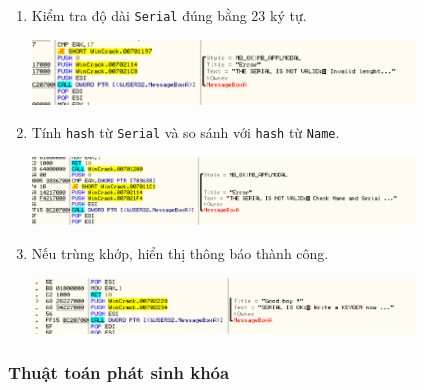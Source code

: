 \begin{enumerate}[label=\textbf{Bước \arabic*:}]
    \item Kiểm tra độ dài \texttt{Serial} đúng bằng 23 ký tự.
    \begin{center}
        \includegraphics[width=0.8\textwidth]{img/file-2/asm7.PNG}
    \end{center}

    \item Tính \texttt{hash} từ \texttt{Serial} và so sánh với \texttt{hash} từ \texttt{Name}.
    \begin{center}
        \includegraphics[width=0.8\textwidth]{img/file-2/asm8.PNG}
    \end{center}

    \item Nếu trùng khớp, hiển thị thông báo thành công.
    \begin{center}
        \includegraphics[width=0.8\textwidth]{img/file-2/asm9.PNG}
    \end{center}
\end{enumerate}

\subsubsection{Thuật toán phát sinh khóa}

